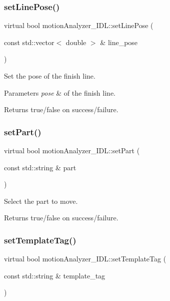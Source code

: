 \subsubsection{\texorpdfstring{setLinePose()}{setLinePose()}}
{\footnotesize\ttfamily virtual bool motion\+Analyzer\+\_\+\+I\+D\+L\+::set\+Line\+Pose (\begin{DoxyParamCaption}\item[{const std\+::vector$<$ double $>$ \&}]{line\+\_\+pose }\end{DoxyParamCaption})\hspace{0.3cm}{\ttfamily [virtual]}}



Set the pose of the finish line. 


\begin{DoxyParams}{Parameters}
{\em pose} & of the finish line. \\
\hline
\end{DoxyParams}
\begin{DoxyReturn}{Returns}
true/false on success/failure. 
\end{DoxyReturn}
\mbox{\label{classmotionAnalyzer__IDL_ae6a1abf3aac4582688320f30a75bf768}} 
\subsubsection{\texorpdfstring{setPart()}{setPart()}}
{\footnotesize\ttfamily virtual bool motion\+Analyzer\+\_\+\+I\+D\+L\+::set\+Part (\begin{DoxyParamCaption}\item[{const std\+::string \&}]{part }\end{DoxyParamCaption})\hspace{0.3cm}{\ttfamily [virtual]}}



Select the part to move. 

\begin{DoxyReturn}{Returns}
true/false on success/failure. 
\end{DoxyReturn}
\mbox{\label{classmotionAnalyzer__IDL_a60012ac489f03d4bd8fb272c557b0144}} 
\subsubsection{\texorpdfstring{setTemplateTag()}{setTemplateTag()}}
{\footnotesize\ttfamily virtual bool motion\+Analyzer\+\_\+\+I\+D\+L\+::set\+Template\+Tag (\begin{DoxyParamCaption}\item[{const std\+::string \&}]{template\+\_\+tag }\end{DoxyParamCaption})\hspace{0.3cm}{\ttfamily [virtual]}}



